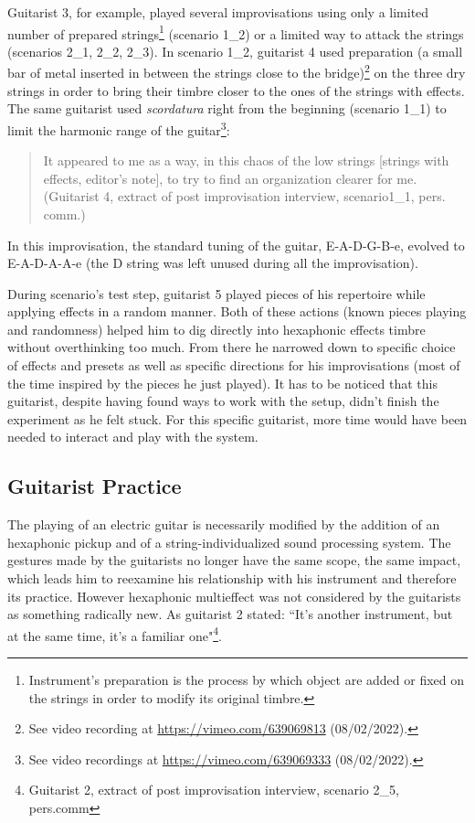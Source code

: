 \documentclass{article}
\begin{document}
Guitarist 3, for example, played several improvisations using only a limited number of prepared strings\footnote{Instrument's preparation is the process by which object are added or fixed on the strings in order to modify its original timbre.} (scenario 1\_2) or a limited way to attack the strings (scenarios 2\_1, 2\_2, 2\_3). In scenario 1\_2, guitarist 4 used preparation (a small bar of metal inserted in between the strings close to the bridge)\footnote{See video recording at \url{https://vimeo.com/639069813} (08/02/2022).} on the three dry strings in order to bring their timbre closer to the ones of the strings with effects. The same guitarist used \textit{scordatura} right from the beginning (scenario 1\_1) to limit the harmonic range of the guitar\footnote{See video recordings at \url{https://vimeo.com/639069333} (08/02/2022).}:
    \begin{quote}
     It appeared to me as a way, in this chaos of the low strings [strings with effects, editor's note], to try to find an organization clearer for me. (Guitarist 4, extract of post improvisation interview, scenario1\_1, pers. comm.)
    \end{quote}
In this improvisation, the standard tuning of the guitar, E-A-D-G-B-e, evolved to E-A-D-A-A-e (the D string was left unused during all the improvisation). 

During scenario's test step, guitarist 5 played pieces of his repertoire while applying effects in a random manner. Both of these actions (known pieces playing and randomness) helped him to dig directly into hexaphonic effects timbre without overthinking too much. From there he narrowed down to specific choice of effects and presets as well as specific directions for his improvisations (most of the time inspired by the pieces he just played).  It has to be noticed that this guitarist, despite having found ways to work with the setup, didn't finish the experiment as he felt stuck. For this specific guitarist, more time would have been needed to interact and play with the system.  

\subsection{Guitarist Practice}
The playing of an electric guitar is necessarily modified by the addition of an hexaphonic pickup and of a string-individualized sound processing system. The gestures made by the guitarists no longer have the same scope, the same impact, which leads him to reexamine his relationship with his instrument and therefore its practice.
However hexaphonic multieffect was not considered by the guitarists as something radically new.  As guitarist 2 stated: ``It's another instrument, but at the same time, it's a familiar one"\footnote{Guitarist 2, extract of post improvisation interview,  scenario 2\_5, pers.comm}. 
\end{document}
